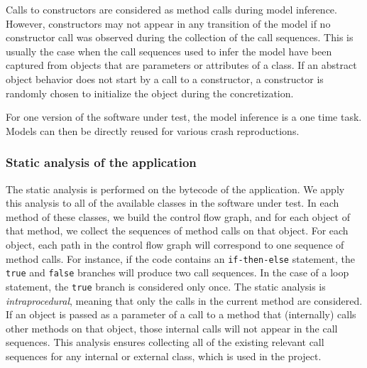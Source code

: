Calls to constructors are considered as method calls during model inference. However, constructors may not appear in any transition of the model if no constructor call was observed during the collection of the call sequences.  This is usually the case when the call sequences used to infer the model have been captured from objects that are parameters or attributes of a class. If an abstract object behavior does not start by a call to a constructor, a constructor is randomly chosen to initialize the object during the concretization.


For one version of the software under test, the model inference is a one time task. Models can then be directly reused for various crash reproductions.

\subsubsection{Static analysis of the application}
\label{ssec:staticanalysis}

The static analysis is performed on the bytecode of the application. We apply this analysis to all of the available classes in the software under test.  In each method of these classes, we build the control flow graph, and for each object of that method, we collect the sequences of method calls on that object.
For each object, each path in the control flow graph will correspond to one sequence of method calls. For instance, if the code contains an \texttt{if-then-else} statement, the \texttt{true} and \texttt{false} branches will produce two call sequences. In the case of a loop statement, the  \texttt{true} branch is considered only once. The static analysis is \emph{intraprocedural}, meaning that only the calls in the current method are considered. If an object is passed as a parameter of a call to a method that (internally) calls other methods on that object, those internal calls will not appear in the call sequences.
This analysis ensures collecting all of the existing relevant call sequences for any internal or external class, which is used in the project.


